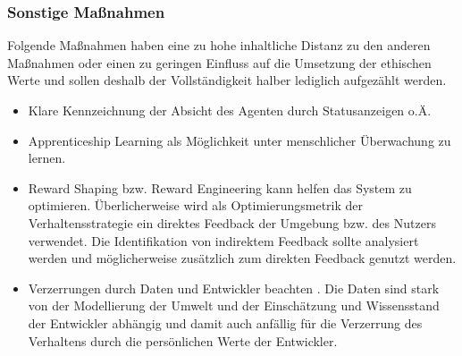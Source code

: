 \subsubsection{Sonstige Maßnahmen}
Folgende Maßnahmen haben eine zu hohe inhaltliche Distanz zu den anderen Maßnahmen oder einen zu geringen Einfluss auf die Umsetzung der ethischen Werte und sollen deshalb der Vollständigkeit halber lediglich aufgezählt werden.
\begin{itemize}
    \item Klare Kennzeichnung der Absicht des Agenten durch Statusanzeigen o.Ä.
    \item Apprenticeship Learning \cite{abbeel2004} als Möglichkeit unter menschlicher Überwachung zu lernen.
    \item Reward Shaping bzw. Reward Engineering \cite{karampatziakis2019} kann helfen das System zu optimieren. Überlicherweise wird als Optimierungsmetrik der Verhaltensstrategie ein direktes Feedback der Umgebung bzw. des Nutzers verwendet. Die Identifikation von indirektem Feedback sollte analysiert werden und möglicherweise zusätzlich zum direkten Feedback genutzt werden.
    \item Verzerrungen durch Daten und Entwickler beachten \cite{thomson2001a}.
    Die Daten sind stark von der Modellierung der Umwelt und der Einschätzung und Wissensstand der Entwickler abhängig und damit auch anfällig für die Verzerrung des Verhaltens durch die persönlichen Werte der Entwickler.
\end{itemize}
